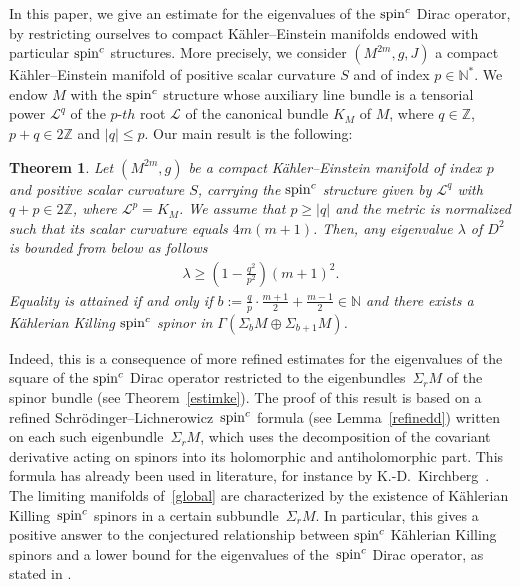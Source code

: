 \documentclass[pdftex]{sigma}
\numberwithin{equation}{section}
\newtheorem{thm}{Theorem}[section]
\theoremstyle{definition}
\begin{document}
In this paper, we give an  estimate for the eigenvalues of the ${\mathop{\rm spin}^c}$ Dirac operator, by restric\-ting ourselves to
compact K\"ahler--Einstein manifolds endowed with particular ${\mathop{\rm spin}^c}$ structures.
More precisely, we consider $(M^{2m},g,J)$  a compact K\"ahler--Einstein manifold of positive scalar curvature $S$ and of index $p\in\mathbb{N}^*$.  We endow $M$ with the ${\mathop{\rm spin}^c}$ structure whose auxiliary line bundle is a tensorial power $\mathcal{L}^q$ of the $p$-$th$ root $\mathcal L$ of the canonical bundle $K_M$ of $M$, where $q \in \mathbb Z$, $p+q\in2\mathbb{Z}$ and $|q|\leq p$. Our main result is the following:

\begin{thm}\label{globestimke}
 Let $(M^{2m}, g)$ be a compact K\"ahler--Einstein manifold of index $p$ and positive scalar curvature $S$, carrying the ${\mathop{\rm spin}^c}$ structure given by $\mathcal{L}^q$ with $q+p\in 2\mathbb{Z}$, where $\mathcal{L}^p=K_M$. We assume that $p \geq |q|$ and the metric is normalized such that its scalar curvature equals $4m(m+1)$.
 Then, any eigenvalue $\lambda$ of $D^2$ is bounded from below as follows
 \begin{gather}\label{global}
\lambda\geq \left(1-\frac{q^2}{p^2}\right) (m+1)^2.
 \end{gather}
Equality is attained if and only if $b:=\frac{q}{p}\cdot\frac{m+1}{2}+\frac{m-1}{2}\in\mathbb{N}$ and there exists a  K\"ahlerian Killing ${\mathop{\rm spin}^c}$ spinor in $\Gamma(\Sigma_{b}M\oplus \Sigma_{b+1} M)$.
\end{thm}

Indeed, this is a consequence of more ref\/ined estimates for the eigenvalues of the square of the ${\mathop{\rm spin}^c}$ Dirac operator restricted to
the eigenbundles~$\Sigma_r M$ of the spinor bundle (see Theorem~\ref{estimke}).
The proof of this result is based on a ref\/ined Schr\"odinger--Lichnerowicz~${\mathop{\rm spin}^c}$ formula (see Lemma~\ref{refinedd}) written
on each such eigenbundle~$\Sigma_rM$, which uses  the decomposition of the covariant derivative acting on spinors into its holomorphic  and antiholomorphic part. This formula has already been used in literature, for instance by K.-D.~Kirchberg~\cite{kircheven}. The limiting manifolds of~\eqref{global} are characterized by the existence of  K\"ahlerian Killing~${\mathop{\rm spin}^c}$ spinors in a certain subbundle~$\Sigma_r M$. In particular, this gives a positive answer to the conjectured relationship between ${\mathop{\rm spin}^c}$ K\"ahlerian Killing spinors and a lower bound
for the eigenvalues of the~${\mathop{\rm spin}^c}$ Dirac operator, as stated in \cite[Remark~16]{hmu}.
\end{document}
